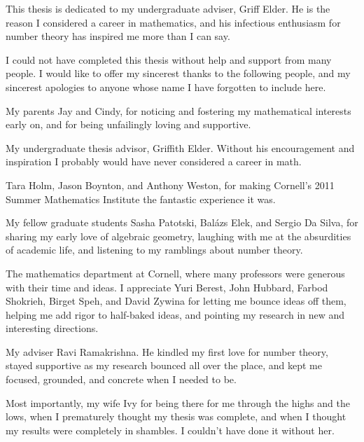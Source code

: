\documentclass[phd,tocprelim]{cornell}
\begin{document}
\begin{dedication}
This thesis is dedicated to my undergraduate adviser, Griff Elder. He is the 
reason I considered a career in mathematics, and his infectious enthusiasm 
for number theory has inspired me more than I can say. 
\end{dedication}





\begin{acknowledgements}
I could not have completed this thesis without help and support from many 
people. I would like to offer my sincerest thanks to the following people, and 
my sincerest apologies to anyone whose name I have forgotten to include here. 

My parents Jay and Cindy, for noticing and fostering my mathematical 
interests early on, and for being unfailingly loving and supportive. 

My undergraduate thesis advisor, Griffith Elder. Without his encouragement 
and inspiration I probably would have never considered a career in math. 

Tara Holm, Jason Boynton, and Anthony Weston, for making Cornell's 2011 Summer 
Mathematics Institute the fantastic experience it was. 

My fellow graduate students Sasha Patotski, Bal\'azs Elek, and Sergio Da 
Silva, for sharing my early love of algebraic geometry, laughing with me at the 
absurdities of academic life, and listening to my ramblings about number theory. 

The mathematics department at Cornell, where many professors were generous 
with their time and ideas. I appreciate Yuri Berest, John Hubbard, Farbod 
Shokrieh, Birget Speh, and David Zywina for letting me bounce ideas off them, 
helping me add rigor to half-baked ideas, and pointing my research in new and 
interesting directions. 

My adviser Ravi Ramakrishna. He kindled my first love for number theory, 
stayed supportive as my research bounced all over the place, and kept me 
focused, grounded, and concrete when I needed to be. 

Most importantly, my wife Ivy for being there for me through the highs 
and the lows, when I prematurely thought my thesis was complete, and when I 
thought my results were completely in shambles. I couldn't have done it without 
her. 
\end{acknowledgements}
\end{document}

